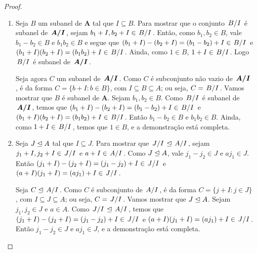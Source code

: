 \begin{proof}
	\begin{enumerate}
	\item Seja $B$ um subanel de $\bm A$ tal que $I \subseteq B$. Para mostrar que o conjunto $\quo{B}{I}$ é subanel de $\bm{\quo{A}{I}}$, sejam $b_1+I,b_2+I \in \quo{B}{I}$. Então, como $b_1,b_2 \in B$, vale $b_1-b_2 \in B$ e $b_1b_2 \in B$ e segue que $(b_1+I)-(b_2+I)=(b_1-b_2)+I \in \quo{B}{I}$ e $(b_1+I)(b_2+I)=(b_1b_2)+I \in \quo{B}{I}$. Ainda, como $1 \in B$, $1+I \in \quo{B}{I}$. Logo $\quo{B}{I}$ é subanel de $\bm{\quo{A}{I}}$.

	Seja agora $C$ um subanel de $\bm{\quo{A}{I}}$. Como $C$ é subconjunto não vazio de $\bm{\quo{A}{I}}$, é da forma $C=\{b + I : b \in B\}$, com $I \subseteq B \subseteq A$; ou seja, $C=\quo{B}{I}$. Vamos mostrar que $B$ é subanel de $\bm A$. Sejam $b_1,b_2 \in B$. Como $\quo{B}{I}$ é subanel de $\bm{\quo{A}{I}}$, temos que $(b_1+I)-(b_2+I)=(b_1-b_2)+I \in \quo{B}{I}$ e $(b_1+I)(b_2+I)=(b_1b_2)+I \in \quo{B}{I}$. Então $b_1-b_2 \in B$ e $b_1b_2 \in B$. Ainda, como $1+I \in \quo{B}{I}$, temos que $1 \in B$, e a demonstração está completa.

	\item Seja $J \mathrel{\unlhd} A$ tal que $I \subseteq J$. Para mostrar que $\quo{J}{I} \ide \quo{A}{I}$, sejam $j_1+I,j_2+I \in \quo{J}{I}$ e $a+I \in \quo{A}{I}$. Como $J \mathrel{\unlhd} A$, vale $j_1-j_2 \in J$ e $aj_1 \in J$. Então $(j_1+I)-(j_2+I)=(j_1-j_2)+I \in \quo{J}{I}$ e $(a+I)(j_1+I)=(aj_1)+I \in \quo{J}{I}$.

	Seja $C \ide \quo{A}{I}$. Como $C$ é subconjunto de $\quo{A}{I}$, é da forma $C=\{j+I : j \in J\}$, com $I \subseteq J \subseteq A$; ou seja, $C=\quo{J}{I}$. Vamos mostrar que $J \mathrel{\unlhd} A$. Sejam $j_1,j_2 \in J$ e $a \in A$. Como $\quo{J}{I} \ide \quo{A}{I}$, temos que $(j_1+I)-(j_2+I)=(j_1-j_2)+I \in \quo{J}{I}$ e $(a+I)(j_1+I)=(aj_1)+I \in \quo{J}{I}$. Então $j_1-j_2 \in J$ e $aj_1 \in J$, e a demonstração está completa.
	\end{enumerate}
\end{proof}

